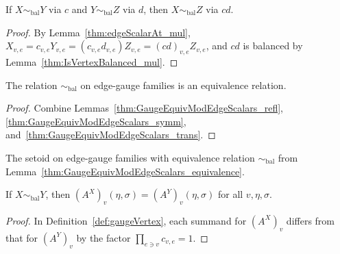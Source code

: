\begin{lemma}%
    \label{thm:GaugeEquivModEdgeScalars_trans}
    \leanok
    If $X\sim_{\mathrm{bal}}Y$ via $c$ and $Y\sim_{\mathrm{bal}}Z$ via $d$,
    then $X\sim_{\mathrm{bal}}Z$ via $cd$.
\end{lemma}
\begin{proof}\leanok
    By Lemma~\ref{thm:edgeScalarAt_mul},
    $X_{v,e}=c_{v,e}Y_{v,e}=(c_{v,e}d_{v,e})Z_{v,e}=(cd)_{v,e}Z_{v,e}$, and $cd$
    is balanced by Lemma~\ref{thm:IsVertexBalanced_mul}.
\end{proof}

\begin{lemma}%
    \label{thm:GaugeEquivModEdgeScalars_equivalence}
    \leanok
    The relation $\sim_{\mathrm{bal}}$ on edge-gauge families is an equivalence
    relation.
\end{lemma}
\begin{proof}\leanok
    Combine Lemmas~\ref{thm:GaugeEquivModEdgeScalars_refl},
    \ref{thm:GaugeEquivModEdgeScalars_symm},
    and~\ref{thm:GaugeEquivModEdgeScalars_trans}.
\end{proof}

\begin{definition}%
    \label{def:GaugeEquivModEdgeScalars_setoid}
    \leanok
    The setoid on edge-gauge families with equivalence relation
    $\sim_{\mathrm{bal}}$ from Lemma~\ref{thm:GaugeEquivModEdgeScalars_equivalence}.
\end{definition}

\begin{lemma}%
    \label{thm:GaugeEquivModEdgeScalars_gaugeVertex_eq}
    \leanok
    If $X\sim_{\mathrm{bal}}Y$, then $(A^X)_v(\eta,\sigma)=(A^Y)_v(\eta,\sigma)$
    for all $v,\eta,\sigma$.
\end{lemma}
\begin{proof}\leanok{}
    In Definition~\ref{def:gaugeVertex}, each summand for $(A^X)_v$ differs from
    that for $(A^Y)_v$ by the factor $\prod_{e\ni v}c_{v,e}=1$.
\end{proof}


